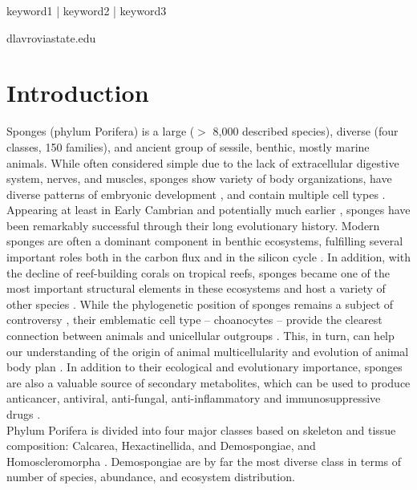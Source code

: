 \begin{keywords}
keyword1 | keyword2 | keyword3
\end{keywords}

\begin{corrauthor}
dlavrov\at iastate.edu
\end{corrauthor}

\section*{Introduction}\label{s:introduction}

Sponges (phylum Porifera) is a large ($>$ 8,000 described species), diverse (four classes, 150 families), and ancient group of sessile, benthic, mostly marine animals.
% 
While often considered simple due to the lack of extracellular digestive system, nerves, and muscles, sponges show variety of body organizations, have diverse patterns of embryonic development \citep{ereskovsky2010}, and contain multiple cell types \citep{musser2021}.
%
Appearing at least in Early Cambrian \citep{botting2015} and potentially much earlier \citep{turner2021}, sponges have been remarkably successful through their long evolutionary history.
% 
Modern sponges are often a dominant component in benthic ecosystems, fulfilling several important roles both in the carbon flux \citep{degoeij2013} and in the silicon cycle \citep{maldonado2012}. 
%
In addition, with the decline of reef-building corals on tropical reefs, sponges became one of the most important structural elements in these ecosystems and host a variety of other species \citep{bell2008, bell2018}. 
%
While the phylogenetic position of sponges remains a subject of controversy \citep{li2021}, their emblematic cell type -- choanocytes -- provide the clearest connection between animals and unicellular outgroups \citep{maldonado2005}  \citep[but see][]{sogabe2019}.
%
This, in turn, can help our understanding of the origin of animal multicellularity and evolution of animal body plan \citep[reviewed in][]{dunn2015,renard2018,cavaliersmith2017}.
%
In addition to their ecological and evolutionary importance, sponges are also a valuable source of secondary metabolites, which can be used to produce anticancer, antiviral, anti-fungal, anti-inflammatory and immunosuppressive drugs \citep{sipkema2005a}.\\
%
Phylum Porifera is divided into four major classes based on skeleton and tissue composition: Calcarea, Hexactinellida, and Demospongiae, and Homoscleromorpha \cite{gazave2012a}.
% 
Demospongiae are by far the most diverse class in terms of number of species, abundance, and ecosystem distribution.
% 


